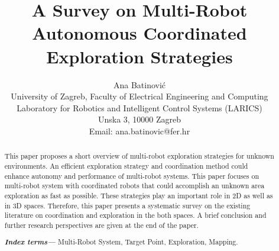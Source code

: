 \documentclass[letterpaper, 10 pt, conference]{ieeeconf}  %
\title{\LARGE \bf
	A Survey on Multi-Robot Autonomous Coordinated Exploration Strategies
}
\author{Ana Batinovi\'{c} \\
	University of Zagreb, Faculty of Electrical Engineering and Computing \\
	Laboratory for Robotics and Intelligent Control Systems (LARICS) \\
	Unska 3, 10000 Zagreb \\
	Email: ana.batinovic@fer.hr
}
\providecommand{\indexterms}[1]{\textbf{\textit{Index terms---}} #1}
\begin{document}
\maketitle

\thispagestyle{empty}
\pagestyle{empty}


\begin{abstract}

This paper proposes a short overview of multi-robot exploration strategies for unknown environments. An efficient exploration strategy and coordination method could enhance autonomy and performance of multi-robot systems. This paper focuses on multi-robot system with coordinated robots that could accomplish an unknown area exploration as fast as possible. These strategies play an important role in 2D as well as in 3D spaces. Therefore, this paper presents a systematic survey on the existing literature on coordination and exploration in the both spaces. A brief conclusion and further research perspectives are given at the end of the paper. 
 
\indexterms{Multi-Robot System, Target Point, Exploration, Mapping.}

\end{abstract}






%






\nocite{*}


\end{document}
